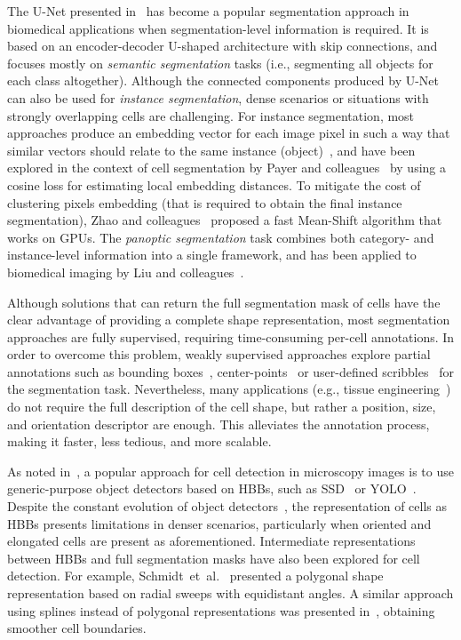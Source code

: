 \documentclass{article}
\begin{document}
The U-Net presented in~\cite{unet} has become a popular segmentation approach in biomedical applications when segmentation-level information is required. It is based on an encoder-decoder U-shaped architecture with skip connections, and focuses mostly on \textit{semantic segmentation} tasks (i.e., segmenting all objects for each class altogether). Although the connected components produced by U-Net can also be used for \emph{instance segmentation}, dense scenarios or situations with strongly overlapping cells are challenging. For instance segmentation, most approaches produce an embedding vector for each image pixel in such a way that similar vectors should relate to the same instance (object)~\cite{newell2017associative}, and have been explored in the context of cell segmentation by Payer and colleagues~\cite{payer2018instance,payer2019segmenting} by using a cosine loss for estimating local embedding distances. To mitigate the cost of clustering pixels embedding (that is required to obtain the final instance segmentation), Zhao and colleagues~\cite{zhao2021faster} proposed a fast Mean-Shift algorithm that works on GPUs. The \textit{panoptic segmentation} task combines both category- and instance-level information into a single framework, and has been applied to biomedical imaging by Liu and colleagues~\cite{liu2021panoptic}.

Although solutions that can return the full segmentation mask of cells have the clear advantage of providing a complete shape representation, most segmentation approaches are fully supervised, requiring time-consuming per-cell annotations. In order to overcome this problem, weakly supervised approaches explore partial annotations such as bounding boxes~\cite{zhao2018deep}, center-points~\cite{zhao2020weakly} or user-defined scribbles~\cite{oh2022scribble} for the segmentation task. Nevertheless, many applications (e.g., tissue engineering~\cite{lu2021biofabrication}) do not require the full description of the cell shape, but rather a position, size, and orientation descriptor are enough. This alleviates the annotation process, making it faster, less tedious, and more scalable.

As noted in~\cite{schmidt2018cell}, a popular approach for cell detection in microscopy images is to use generic-purpose object detectors based on HBBs, such as SSD~\cite{liu2016ssd} or YOLO~\cite{redmon2016you}. Despite the constant evolution of object detectors~\cite{carion2020end,tan2020efficientdet,Wang_2021_CVPR,yang2022focal}, the representation of cells as HBBs presents limitations in denser scenarios, particularly when oriented and elongated cells are present as aforementioned. Intermediate representations between HBBs and full segmentation masks have also been explored for cell detection. For example, Schmidt~et~al.~\cite{schmidt2018cell} presented a polygonal shape representation based on radial sweeps with equidistant angles. A similar approach using splines instead of polygonal representations was presented in~\cite{mandal2021splinedist}, obtaining smoother cell boundaries. 
\end{document}
